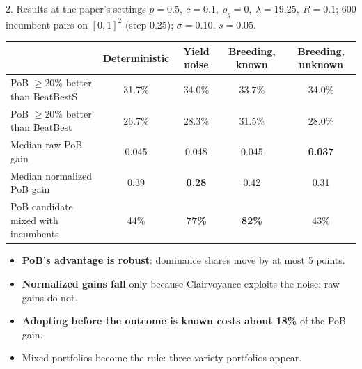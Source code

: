 \documentclass[aspectratio=169,10pt]{beamer}
\begin{document}
\begin{frame}{2. Results at the paper's settings}
\small $p=0.5,\ c=0.1,\ \rho_g=0,\ \lambda=19.25,\ R=0.1$; 600 incumbent pairs on $[0,1]^2$ (step 0.25); $\sigma=0.10$, $s=0.05$.
\vspace{2mm}

\centering
\begin{tabular}{lcccc}
\toprule
 & Deterministic & Yield noise & Breeding, known & Breeding, unknown\\
\midrule
PoB $\ge$20\% better than BeatBestS & 31.7\% & 34.0\% & 33.7\% & 34.0\%\\
PoB $\ge$20\% better than BeatBest & 26.7\% & 28.3\% & 31.5\% & 28.0\%\\
Median raw PoB gain & 0.045 & 0.048 & 0.045 & \textbf{0.037}\\
Median normalized PoB gain & 0.39 & \textbf{0.28} & 0.42 & 0.31\\
PoB candidate mixed with incumbents & 44\% & \textbf{77\%} & \textbf{82\%} & 43\%\\
\bottomrule
\end{tabular}
\vspace{3mm}
\raggedright
\begin{itemize}
\item \textbf{PoB's advantage is robust}: dominance shares move by at most 5 points.
\item \textbf{Normalized gains fall} only because Clairvoyance exploits the noise; raw gains do not.
\item \textbf{Adopting before the outcome is known costs about 18\%} of the PoB gain.
\item Mixed portfolios become the rule: three-variety portfolios appear.
\end{itemize}
\end{frame}
\end{document}
